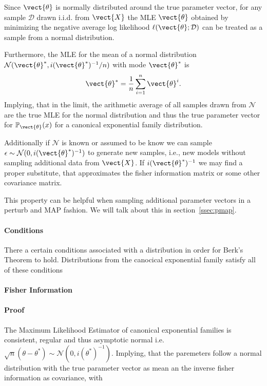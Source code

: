         Since $\vect{\theta}$ is normally distributed around the true parameter vector, for any sample $\mathcal{D}$ drawn i.i.d. from $\vect{X}$ the MLE $\vect{\theta}$ obtained by minimizing the negative average log likelihood $\ell(\vect{\theta}; \mathcal{D})$ can be treated as a sample from a normal distribution.

        Furthermore, the MLE for the mean of a normal distribution $\mathcal{N}(\vect{\theta}^*, i(\vect{\theta}^*)^{-1}/n)$ with mode $\vect{\theta}^*$ is
        \begin{equation}
            \vect{\theta}^* = \frac{1}{n} \sum_{i=1}^n \vect{\theta}^{i}.
        \end{equation}
        Implying, that in the limit, the arithmetic average of all samples drawn from $\mathcal{N}$ are the true MLE for the normal distribution and thus the true parameter vector for $\mathbb{P}_{\vect{\theta}}(x)$ for a canonical exponential family distribution.
        
        Additionally if $\mathcal{N}$ is known or assumed to be know we can sample $\epsilon \sim \mathcal{N}(0, i(\vect{\theta}^*)^{-1})$ to generate new samples, i.e., new models without sampling additional data from $\vect{X}$.
        If $ i(\vect{\theta}^*)^{-1}$ we may find a proper substitute, that approximates the fisher information matrix or some other covariance matrix.

        This property can be helpful when sampling additional parameter vectors in a perturb and MAP fashion. We will talk about this in section~\ref{ssec:pmap}.
        
        \paragraph*{Conditions}
        There a certain conditions associated with a distribution in order for Berk's Theorem to hold.
        Distributions from the canocical exponential family satisfy all of these conditions
        \paragraph*{Fisher Information}
        \paragraph*{Proof}
        The Maximum Likelihood Estimator of canonical exponential families is consistent, regular and thus asymptotic normal i.e. $\sqrt{n}(\theta - \theta^*) \sim \mathcal{N}(0, i(\theta^*)^{-1})$.
        Implying, that the paremeters follow a normal distribution with the  true parameter vector as mean an the inverse fisher information as covariance, with 

